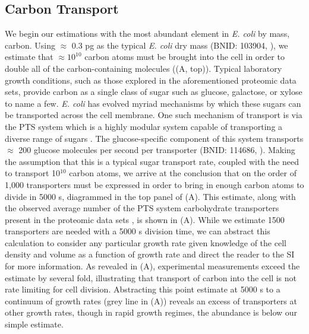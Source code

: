 \subsection{Carbon Transport}
We begin our estimations with the most abundant element in \textit{E. coli}
by mass, carbon. Using $\approx$ 0.3 pg as the typical \textit{E. coli} dry
mass (BNID: 103904, \cite{milo2010}), we estimate that $\approx 10^{10}$
carbon atoms must be brought into the cell in order to double all of the
carbon-containing molecules ((A, top)). Typical laboratory
growth conditions, such as those explored in the aforementioned proteomic
data sets, provide carbon as a single class of sugar such as glucose,
galactose, or xylose to name a few. \textit{E. coli} has evolved myriad
mechanisms by which these sugars can be transported across the cell membrane.
One such mechanism of transport is via the PTS system which is a highly
modular system capable of transporting a diverse range of sugars
\citep{escalante2012}. The glucose-specific component of this system
transports $\approx$ 200 glucose molecules per second per transporter (BNID:
114686, \cite{milo2010}). Making the assumption that this is a typical sugar
transport rate, coupled with the need to transport 10$^{10}$ carbon atoms, we
arrive at the conclusion that on the order of 1,000 transporters must be
expressed in order to bring in enough carbon atoms to divide in 5000 s,
diagrammed in the top panel of (A). This estimate, along
with the observed average number of the PTS system carbohydrate transporters present in the
proteomic data sets \citep{schmidt2016, peebo2015,valgepea2013,li2014}, is
shown in (A). While we estimate 1500 transporters are
needed with a 5000 s division time, we can abstract this calculation to consider
any particular growth rate given knowledge of the cell density and volume as a
function of growth rate and direct the reader to the SI for more information. As
revealed in (A), experimental measurements exceed the estimate
by several fold, illustrating that transport of carbon into the cell is not
rate limiting for cell division. Abstracting this point estimate at 5000 s to a
continuum of growth rates (grey line in (A)) reveals an excess
of transporters at other growth rates, though in rapid growth regimes, the
abundance is below our simple estimate.
